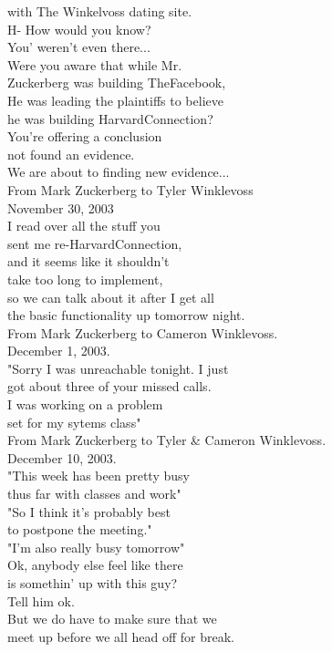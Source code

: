 \documentclass{article}
\begin{document}
\begin{multicols}{3}
with The Winkelvoss dating site.\\
H- How would you know?\\
You' weren't even there...\\
Were you aware that while Mr.\\
Zuckerberg was building TheFacebook,\\
He was leading the plaintiffs to believe\\
he was building HarvardConnection?\\
You're offering a conclusion\\
not found an evidence.\\
We are about to finding new evidence...\\
From Mark Zuckerberg to Tyler Winklevoss\\
November 30, 2003\\
I read over all the stuff you\\
sent me re-HarvardConnection,\\
and it seems like it shouldn't\\
take too long to implement,\\
so we can talk about it after I get all\\
the basic functionality up tomorrow night.\\
From Mark Zuckerberg to Cameron Winklevoss.\\
December 1, 2003.\\
"Sorry I was unreachable tonight. I just\\
got about three of your missed calls.\\
I was working on a problem\\
set for my sytems class"\\
From Mark Zuckerberg to Tyler \& Cameron Winklevoss.\\
December 10, 2003.\\
"This week has been pretty busy\\
thus far with classes and work"\\
"So I think it's probably best\\
to postpone the meeting."\\
"I'm also really busy tomorrow"\\
Ok, anybody else feel like there\\
is somethin' up with this guy?\\
Tell him ok.\\
But we do have to make sure that we\\
meet up before we all head off for break.\\

\end{multicols}
\end{document}

